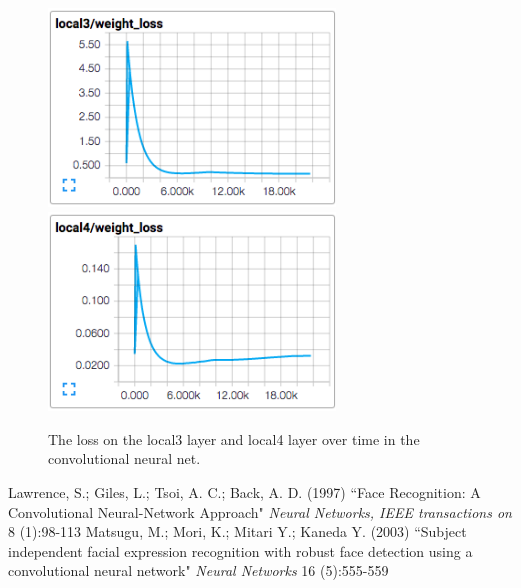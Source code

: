 \documentclass[11pt, twocolumn, twoside]{article}
\begin{document}
\begin{figure}
	\centering
	\includegraphics[width=3in]{local3_loss}
	\includegraphics[width=3in]{local4_loss}
	\caption{The loss on the local3 layer and local4 layer over time in the convolutional neural net.}
	\label{fig:layer_loss}
\end{figure}


\begin{thebibliography}{9}
Lawrence, S.; Giles, L.; Tsoi, A. C.; Back, A. D. (1997)
``Face Recognition: A Convolutional Neural-Network Approach"
\textit{Neural Networks, IEEE transactions on} 8 (1):98-113
Matsugu, M.; Mori, K.; Mitari Y.; Kaneda Y. (2003)
``Subject independent facial expression recognition with robust face detection using a convolutional neural network"
\textit{Neural Networks} 16 (5):555-559
\end{thebibliography}
\end{document}
